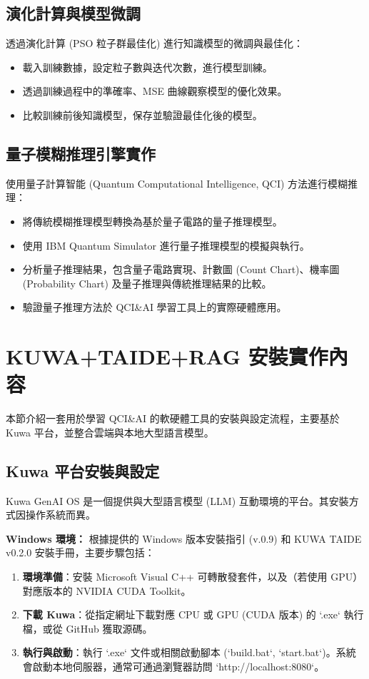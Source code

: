 \documentclass[twocolumn,11pt,a4paper]{article}
\begin{document}
\subsection{演化計算與模型微調}

透過演化計算 (PSO 粒子群最佳化) 進行知識模型的微調與最佳化：

\begin{itemize}
    \item 載入訓練數據，設定粒子數與迭代次數，進行模型訓練。
    \item 透過訓練過程中的準確率、MSE 曲線觀察模型的優化效果。
    \item 比較訓練前後知識模型，保存並驗證最佳化後的模型。
\end{itemize}

\subsection{量子模糊推理引擎實作}

使用量子計算智能 (Quantum Computational Intelligence, QCI) 方法進行模糊推理：

\begin{itemize}
    \item 將傳統模糊推理模型轉換為基於量子電路的量子推理模型。
    \item 使用 IBM Quantum Simulator 進行量子推理模型的模擬與執行。
    \item 分析量子推理結果，包含量子電路實現、計數圖 (Count Chart)、機率圖 (Probability Chart) 及量子推理與傳統推理結果的比較。
    \item 驗證量子推理方法於 QCI\&AI 學習工具上的實際硬體應用。
\end{itemize}


\section{KUWA+TAIDE+RAG 安裝實作內容}
本節介紹一套用於學習 QCI\&AI 的軟硬體工具的安裝與設定流程，主要基於 Kuwa 平台，並整合雲端與本地大型語言模型。

\subsection{Kuwa 平台安裝與設定}
Kuwa GenAI OS 是一個提供與大型語言模型 (LLM) 互動環境的平台。其安裝方式因操作系統而異。

\textbf{Windows 環境：} 根據提供的 Windows 版本安裝指引 (v.0.9) 和 KUWA TAIDE v0.2.0 安裝手冊，主要步驟包括：
\begin{enumerate}[noitemsep, topsep=0pt]
    \item \textbf{環境準備}：安裝 Microsoft Visual C++ 可轉散發套件，以及（若使用 GPU）對應版本的 NVIDIA CUDA Toolkit。
    \item \textbf{下載 Kuwa}：從指定網址下載對應 CPU 或 GPU (CUDA 版本) 的 `.exe` 執行檔，或從 GitHub 獲取源碼。
    \item \textbf{執行與啟動}：執行 `.exe` 文件或相關啟動腳本 (`build.bat`, `start.bat`)。系統會啟動本地伺服器，通常可通過瀏覽器訪問 `http://localhost:8080`。
\end{enumerate}
\end{document}
